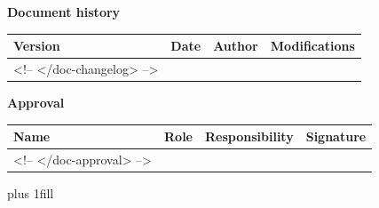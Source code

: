 \begin{flushleft}
    \textcolor{AlabRed}{\textbf{Document history}}\\
\end{flushleft}
\vspace{1ex}

\begin{tabular}{ | p{}| p{}| p{}| p{}| } %
    \hline
    \rowcolor{AlabTableColLightBlue}
    \textbf{Version} & \textbf{Date} & \textbf{Author} & \textbf{Modifications} \\
    \hline
    <!-- </doc-changelog> -->
    \hline
\end{tabular} %
\vspace{1ex}

        

\begin{flushleft}
    \textcolor{AlabRed}{\textbf{Approval}}\\
\end{flushleft}
\vspace{1ex}

\begin{tabular}{ | p{}| p{}| p{}| p{}| } %
    \hline
    \rowcolor{AlabTableColLightBlue}
    \textbf{Name} & \textbf{Role} & \textbf{Responsibility} & \textbf{Signature} \\
    \hline
    <!-- </doc-approval> -->
    \hline
\end{tabular} %
\vspace{1ex}
\hbox{}\vskip 0cm plus 1fill
\pagebreak
